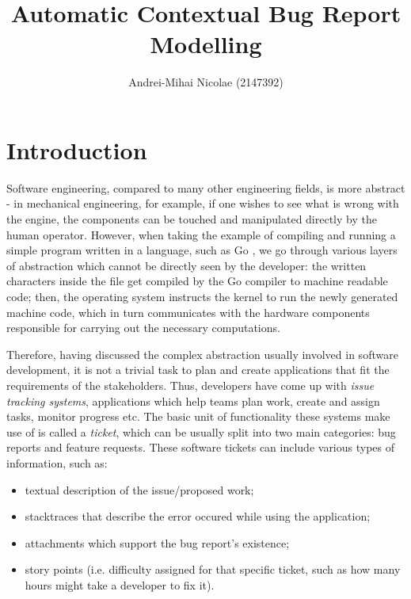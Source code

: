 \documentclass[11pt,english,twocolumn]{article}
\begin{document}
\title{Automatic Contextual Bug Report Modelling}

\author{Andrei-Mihai Nicolae (2147392)}
\date{}
\maketitle

\section{Introduction}
\label{sec:Introduction}

Software engineering, compared to many other engineering fields, is more
abstract \cite{brooks1995mythical} - in mechanical engineering, for example,
if one wishes to see what is wrong with the engine, the components can be 
touched and manipulated directly by the human operator. However, when taking the example of
compiling and running a simple program written in a language, such as Go 
\cite{golang}, we go through various layers of abstraction which cannot be directly 
seen by the developer: the written characters inside the file get compiled by the
Go compiler to machine readable code; then, the operating system instructs the 
kernel to run the newly generated machine code, which in turn communicates with 
the hardware components responsible for carrying out the necessary computations.

Therefore, having discussed the complex abstraction usually involved in software development,
it is not a trivial task to plan and create applications that fit the requirements of the
stakeholders. Thus, developers have come up with \emph{issue tracking systems}, applications
which help teams plan work, create and assign tasks, monitor progress etc. The basic unit of
functionality these systems make use of is called a \emph{ticket}, which can be usually split
into two main categories: bug reports and feature requests. These software tickets can include 
various types of information, such as:
\begin{itemize}
	\item textual description of the issue/proposed work;
	\item stacktraces that describe the error occured while using the application;
	\item attachments which support the bug report's existence;
	\item story points (i.e. difficulty assigned for that specific ticket, such as 
	how many hours might take a developer to fix it).
\end{itemize}
\end{document}
